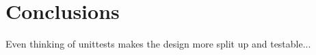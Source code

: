 \section{Conclusions}
\label{Conclusions}

Even thinking of unittests makes the design more split up and testable...